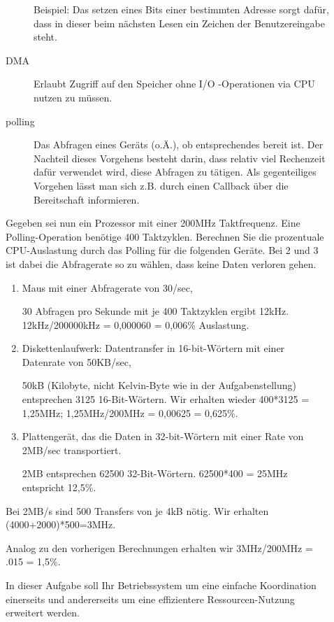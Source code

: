 \begin{description}
\begin{description}
        Beispiel: Das setzen eines Bits einer bestimmten Adresse sorgt dafür, dass in dieser beim nächsten Lesen ein Zeichen der Benutzereingabe steht.
      \item[DMA]
        Erlaubt Zugriff auf den Speicher ohne I/O -Operationen via CPU nutzen zu müssen.
      \item[polling] Das Abfragen eines Geräts (o.Ä.), ob entsprechendes bereit ist.
        Der Nachteil dieses Vorgehens besteht darin, dass relativ viel Rechenzeit dafür verwendet wird, diese Abfragen zu tätigen. Als gegenteiliges Vorgehen lässt man sich z.B. durch einen Callback über die Bereitschaft informieren.
    \end{description}

Gegeben sei nun ein Prozessor mit einer 200MHz Taktfrequenz. Eine Polling-Operation 
benötige 400 Taktzyklen. Berechnen Sie die prozentuale CPU-Auslastung durch das Polling für die folgenden Geräte. Bei 2 und 3 ist dabei die Abfragerate so zu wählen, dass keine Daten verloren gehen. 
    \begin{enumerate}[label=\arabic*.]
      \item Maus mit einer Abfragerate von 30/sec, 

        30 Abfragen pro Sekunde mit je 400 Taktzyklen ergibt 12kHz. 12kHz/200000kHz = 0,000060 = 0,006\% Auslastung.
      \item Diskettenlaufwerk: Datentransfer in 16-bit-Wörtern mit einer Datenrate von 50KB/sec, 

        50kB (Kilobyte, nicht Kelvin-Byte wie in der Aufgabenstellung) entsprechen 3125 16-Bit-Wörtern. Wir erhalten wieder 400*3125 = 1,25MHz; 1,25MHz/200MHz = 0,00625 = 0,625\%.
      \item Plattengerät, das die Daten in 32-bit-Wörtern mit einer Rate von 2MB/sec transportiert. 

        2MB entsprechen 62500 32-Bit-Wörtern. 62500*400 = 25MHz entspricht 12,5\%.
    \end{enumerate}

    Bei 2MB/s sind 500 Transfers von je 4kB nötig.
    Wir erhalten (4000+2000)*500=3MHz.

    Analog zu den vorherigen Berechnungen erhalten wir 3MHz/200MHz = .015 = 1,5\%.


In dieser Aufgabe soll Ihr Betriebssystem um eine einfache Koordination einerseits und 
andererseits um eine effizientere Ressourcen-Nutzung erweitert werden. 


\end{description}
